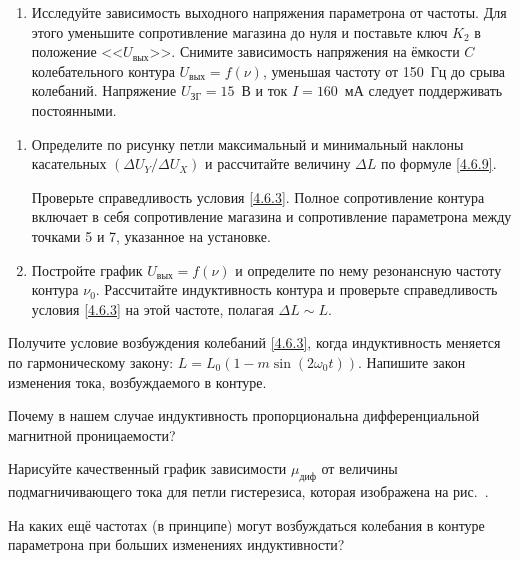 \begin{lab:task}
\begin{enumerate}
Подберите коэффициенты усиления так, чтобы петля занимала практически весь
экран. Зарисуйте на кальку петлю, оси координат, деления шкалы и запишите на ней
рабочие параметры схемы и коэффициенты $K_X$ и $K_Y$.

\item Исследуйте зависимость выходного напряжения параметрона от частоты. Для
этого уменьшите сопротивление магазина до нуля и поставьте ключ $K_2$ в
положение <<$U_\text{вых}$>>. Снимите зависимость напряжения на ёмкости $C$
колебательного контура $U_\text{вых} = f(\nu)$, уменьшая частоту от 150~Гц до
срыва колебаний. Напряжение $U_\text{ЗГ} = 15$~В и ток $I = 160$~мА следует
поддерживать постоянными.
\end{enumerate}


\begin{enumerate}
\item
Определите по рисунку петли максимальный и минимальный наклоны касательных
$(\Delta U_Y/ \Delta U_X)$ и рассчитайте величину $\Delta L$ по формуле
\eqref{4.6.9}.

Проверьте справедливость условия \eqref{4.6.3}. Полное сопротивление контура
включает в себя сопротивление магазина и сопротивление параметрона между точками
5 и 7, указанное на установке.

\item
Постройте график $U_\text{вых} = f(\nu)$ и определите по нему резонансную
частоту контура $\nu_0$. Рассчитайте индуктивность контура
и проверьте справедливость условия \eqref{4.6.3} на
этой частоте, полагая $\Delta L \sim L$.
\end{enumerate}
\end{lab:task}


\begin{lab:questions}
\item
Получите условие возбуждения колебаний \eqref{4.6.3}, когда индуктивность
меняется по гармоническому закону: $L = L_0(1-m\sin(2\omega_0t))$. Напишите закон
изменения тока, возбуждаемого в контуре.

\item
Почему в нашем случае индуктивность пропорциональна дифференциальной магнитной
проницаемости?

\item
Нарисуйте качественный график зависимости $\mu_\text{диф}$ от величины
подмагничивающего тока для петли гистерезиса, которая изображена на
рис.~.

\item
На каких ещё частотах (в принципе) могут возбуждаться колебания в контуре
параметрона при больших изменениях индуктивности?
\end{lab:questions}

